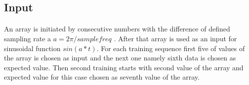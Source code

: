 \documentclass{article}
\begin{document}
\subsection{Input}
\paragraph{}
An array is initiated by consecutive numbers with the difference of defined sampling rate a \( a = 2\pi/sample freq\) . After that array is used as an input for sinusoidal function \( sin(a*t) \).  For each training sequence first five of values of the array is chosen as input and the next one namely sixth data is chosen as expected value. Then second training starts with second value of the array and expected value for this case chosen as seventh value of the array.
\paragraph{}
\end{document}
